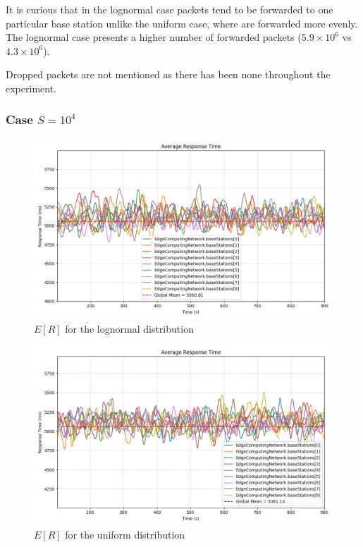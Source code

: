 \documentclass{report}
\begin{document}
It is curious that in the lognormal case packets tend to be forwarded to one particular base station unlike the uniform case, where are forwarded more evenly. The lognormal case presents a higher number of forwarded packets ($5.9\times10^6$ vs $4.3\times10^6$).

Dropped packets are not mentioned as there has been none throughout the experiment.

\subsubsection*{Case $S=10^4$}

\begin{figure}[H]
    \centering
    \includegraphics[width=\textwidth]{img/plots/log_1e4_B/resptime.png}
    \caption{$E[R]$ for the lognormal distribution}
\end{figure}

\begin{figure}[H]
    \centering
    \includegraphics[width=\textwidth]{img/plots/uni_1e4_B/resptime.png}
    \caption{$E[R]$ for the uniform distribution}
\end{figure}
\end{document}
